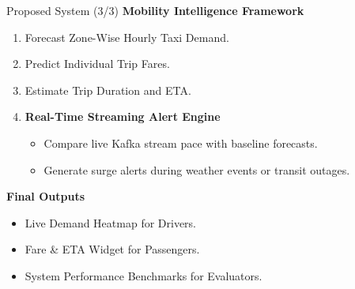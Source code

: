 \documentclass[aspectratio=169]{beamer}
\begin{document}
\begin{frame}{Proposed System (3/3)}
  \textbf{Mobility Intelligence Framework}
  \vspace{4pt}
  \begin{enumerate}
    \item Forecast Zone-Wise Hourly Taxi Demand.
    \item Predict Individual Trip Fares.
    \item Estimate Trip Duration and ETA.
    \item \textbf{Real-Time Streaming Alert Engine}
      \begin{itemize}
        \item Compare live Kafka stream pace with baseline forecasts.
        \item Generate surge alerts during weather events or transit outages.
      \end{itemize}
  \end{enumerate}
  \vspace{4pt}
  \textbf{Final Outputs}
  \begin{itemize}
    \item Live Demand Heatmap for Drivers.
    \item Fare \& ETA Widget for Passengers.
    \item System Performance Benchmarks for Evaluators.
  \end{itemize}
\end{frame}
\end{document}
